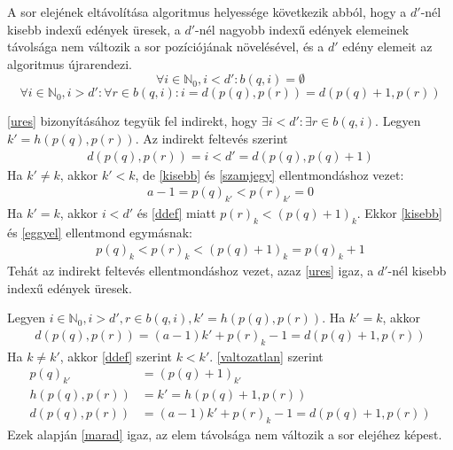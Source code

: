 A sor elejének eltávolítása algoritmus helyessége következik abból, hogy a $d'$-nél kisebb indexű edények üresek, a $d'$-nél nagyobb indexű edények elemeinek távolsága nem változik a sor pozíciójának növelésével, és a $d'$ edény elemeit az algoritmus újrarendezi.
\begin{equation}
\label{ures}
\forall i \in \mathbb{N}_0, i<d': b(q, i) = \emptyset
\end{equation}
\begin{equation}
\label{marad}
\forall i \in \mathbb{N}_0, i>d': \forall r \in b(q, i) : i = d(p(q), p(r)) = d(p(q)+1, p(r))
\end{equation}

\ref{ures} bizonyításához tegyük fel indirekt, hogy $\exists i < d': \exists r \in b(q, i)$.
Legyen $k'=h(p(q), p(r))$. Az indirekt feltevés szerint
\begin{align*}
d(p(q), p(r)) = i < d' = d(p(q), p(q)+1)
\end{align*}
Ha $k' \not = k$, akkor $k' < k$, de \ref{kisebb} és \ref{szamjegy} ellentmondáshoz vezet:
\begin{align*}
a-1 = p(q)_{k'} < p(r)_{k'} = 0
\end{align*}
Ha $k' = k$, akkor $i < d'$ és \ref{ddef} miatt $p(r)_k < (p(q)+1)_k$. Ekkor \ref{kisebb} és \ref{eggyel} ellentmond egymásnak:
\begin{align*}
p(q)_k < p(r)_k < (p(q)+1)_k = p(q)_k + 1
\end{align*}
Tehát az indirekt feltevés ellentmondáshoz vezet, azaz \ref{ures} igaz, a $d'$-nél kisebb indexű edények üresek.

Legyen $i \in \mathbb{N}_0, i>d', r \in b(q, i), k'=h(p(q), p(r))$.
Ha $k' = k$, akkor
\begin{align*}
d(p(q), p(r)) = (a-1)k'+p(r)_k-1=d(p(q)+1, p(r))
\end{align*}
Ha $k \not = k'$, akkor \ref{ddef} szerint $k < k'$.
\ref{valtozatlan} szerint
\begin{align*}
p(q)_{k'} &= (p(q)+1)_{k'} \\
h(p(q), p(r)) &= k' = h(p(q)+1, p(r)) \\
d(p(q), p(r)) &= (a-1)k'+p(r)_k-1=d(p(q)+1, p(r))
\end{align*}
Ezek alapján \ref{marad} igaz, az elem távolsága nem változik a sor elejéhez képest.

